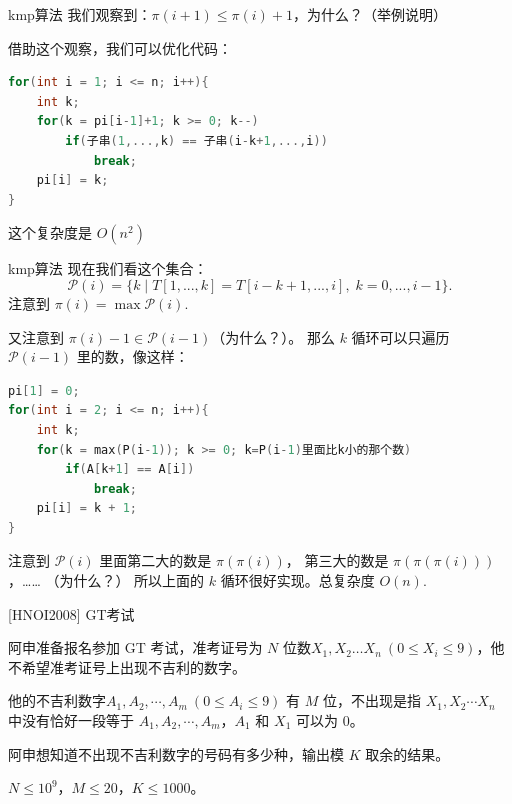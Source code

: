 \documentclass{beamer}
\begin{document}
\begin{frame}[fragile]{kmp算法}
    \footnotesize
    我们观察到：$\pi(i+1)\leq \pi(i)+1$，为什么？（举例说明）

    \vspace{1em}\pause
    借助这个观察，我们可以优化代码：
    \begin{lstlisting}[language=c++]
for(int i = 1; i <= n; i++){
    int k;
    for(k = pi[i-1]+1; k >= 0; k--)
        if(子串(1,...,k) == 子串(i-k+1,...,i))
            break;
    pi[i] = k;
}
    \end{lstlisting}

    这个复杂度是 $O(n^2)$
\end{frame}

\begin{frame}[fragile]{kmp算法}
    \footnotesize
    现在我们看这个集合：
    \begin{equation*}
        \mathcal{P}(i)=\{k\;|\; T[1,...,k]=T[i-k+1,...,i],\; k=0,...,i-1\}.
    \end{equation*}
    注意到 $\pi(i)=\max \mathcal{P}(i)$.

    \vspace{1em}\pause
    又注意到 $\pi(i)-1\in\mathcal{P}(i-1)$（为什么？）。
    \pause 那么 $k$ 循环可以只遍历 $\mathcal{P}(i-1)$ 里的数，像这样：

    \begin{lstlisting}[language=c++]
pi[1] = 0;
for(int i = 2; i <= n; i++){
    int k;
    for(k = max(P(i-1)); k >= 0; k=P(i-1)里面比k小的那个数)
        if(A[k+1] == A[i])
            break;
    pi[i] = k + 1;
}
    \end{lstlisting}

    \vspace{1em}\pause
    注意到 $\mathcal{P}(i)$ 里面第二大的数是 $\pi(\pi(i))$，
    第三大的数是 $\pi(\pi(\pi(i)))$，…… （为什么？）
    所以上面的 $k$ 循环很好实现。总复杂度 $O(n)$.
\end{frame}

\begin{frame}{[HNOI2008] GT考试}

    \small 
    阿申准备报名参加 GT 考试，准考证号为 $N$ 位数$X_1,X_2…X_n\ (0\le X_i\le 9)$，他不希望准考证号上出现不吉利的数字。
    
    \vspace{1em}
    他的不吉利数字$A_1,A_2,\cdots, A_m\ (0\le A_i\le 9)$ 有 $M$ 位，不出现是指 $X_1,X_2\cdots X_n$ 中没有恰好一段等于 $A_1,A_2,\cdots ,A_m$，$A_1$ 和 $X_1$ 可以为 $0$。

    \vspace{1em}
    阿申想知道不出现不吉利数字的号码有多少种，输出模 $K$ 取余的结果。

    \vspace{1em}
    $N\leq10^9$，$M\leq 20$，$K\leq1000$。
\end{frame}
\end{document}
